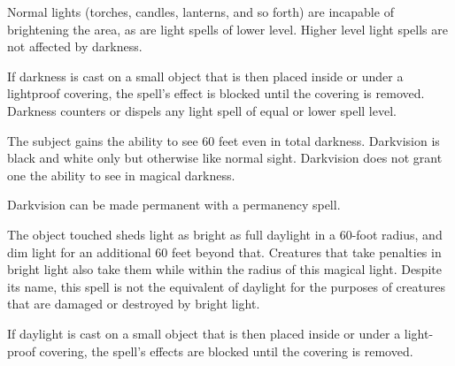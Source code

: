 \begin{multicols}{2}
\begin{small}
\smallskip\noindent Normal lights (torches, candles, lanterns, and so forth) are incapable of brightening the area, as are light spells of lower level. Higher level light spells are not affected by darkness.

\smallskip\noindent If darkness is cast on a small object that is then placed inside or under a lightproof covering, the spell's effect is blocked until the covering is removed.
Darkness counters or dispels any light spell of equal or lower spell level.


\noindent The subject gains the ability to see 60 feet even in total darkness. Darkvision is black and white only but otherwise like normal sight. Darkvision does not grant one the ability to see in magical darkness.

\smallskip\noindent Darkvision can be made permanent with a permanency spell.


\noindent The object touched sheds light as bright as full daylight in a 60-foot radius, and dim light for an additional 60 feet beyond that. Creatures that take penalties in bright light also take them while within the radius of this magical light. Despite its name, this spell is not the equivalent of daylight for the purposes of creatures that are damaged or destroyed by bright light.

\smallskip\noindent If daylight is cast on a small object that is then placed inside or under a light- proof covering, the spell's effects are blocked until the covering is removed.


\end{small}
\end{multicols}
